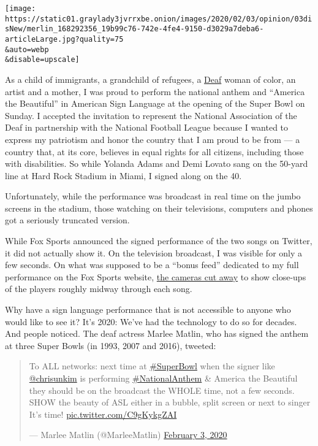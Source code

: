 \texttt{[image: https://static01.graylady3jvrrxbe.onion/images/2020/02/03/opinion/03disNew/merlin\_168292356\_19b99c76-742e-4fe4-9150-d3029a7deba6-articleLarge.jpg?quality=75\\\&auto=webp\\\&disable=upscale]}

As a child of immigrants, a grandchild of refugees, a
\href{https://www.nad.org/resources/american-sign-language/community-and-culture-frequently-asked-questions/}{Deaf}
woman of color, an artist and a mother, I was proud to perform the
national anthem and ``America the Beautiful'' in American Sign Language
at the opening of the Super Bowl on Sunday. I accepted the invitation to
represent the National Association of the Deaf in partnership with the
National Football League because I wanted to express my patriotism and
honor the country that I am proud to be from --- a country that, at its
core, believes in equal rights for all citizens, including those with
disabilities. So while Yolanda Adams and Demi Lovato sang on the 50-yard
line at Hard Rock Stadium in Miami, I signed along on the 40.

Unfortunately, while the performance was broadcast in real time on the
jumbo screens in the stadium, those watching on their televisions,
computers and phones got a seriously truncated version.

While Fox Sports announced the signed performance of the two songs on
Twitter, it did not actually show it. On the television broadcast, I was
visible for only a few seconds. On what was supposed to be a ``bonus
feed'' dedicated to my full performance on the Fox Sports website,
\href{https://twitter.com/mhairiforrest/status/1224168857973092354?s=21}{the
cameras cut away} to show close-ups of the players roughly midway
through each song.

Why have a sign language performance that is not accessible to anyone
who would like to see it? It's 2020: We've had the technology to do so
for decades. And people noticed. The deaf actress Marlee Matlin, who has
signed the anthem at three Super Bowls (in 1993, 2007 and 2016),
tweeted:

\begin{quote}
To ALL networks: next time at
\href{https://twitter.com/hashtag/SuperBowl?src=hash\&ref_src=twsrc\%5Etfw}{\#SuperBowl}
when the signer like
\href{https://twitter.com/chrisunkim?ref_src=twsrc\%5Etfw}{@chrisunkim}
is performing
\href{https://twitter.com/hashtag/NationalAnthem?src=hash\&ref_src=twsrc\%5Etfw}{\#NationalAnthem}
\& America the Beautiful they should be on the broadcast the WHOLE time,
not a few seconds. SHOW the beauty of ASL either in a bubble, split
screen or next to singer It's time!
\href{https://t.co/C9gKykgZAI}{pic.twitter.com/C9gKykgZAI}

--- Marlee Matlin (@MarleeMatlin)
\href{https://twitter.com/MarleeMatlin/status/1224153599506186240?ref_src=twsrc\%5Etfw}{February
3, 2020}
\end{quote}

